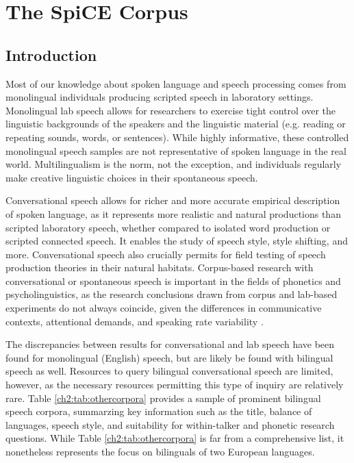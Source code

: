 
\chapter{The SpiCE Corpus}
\label{ch:Corpus}
\thispagestyle{fancy}

\section{Introduction}\label{ch2:sec:introduction}
Most of our knowledge about spoken language and speech processing comes from monolingual individuals producing scripted speech in laboratory settings. Monolingual lab speech allows for researchers to exercise tight control over the linguistic backgrounds of the speakers and the linguistic material (e.g. reading or repeating sounds, words, or sentences). While highly informative, these controlled monolingual speech samples are not representative of spoken language in the real world. Multilingualism is the norm, not the exception, and individuals regularly make creative linguistic choices in their spontaneous speech.

Conversational speech allows for richer and more accurate empirical description of spoken language, as it represents more realistic and natural productions than scripted laboratory speech, whether compared to isolated word production or scripted connected speech. It enables the study of speech style, style shifting, and more. Conversational speech also crucially permits for field testing of speech production theories in their natural habitats. Corpus-based research with conversational or spontaneous speech is important in the fields of phonetics and psycholinguistics, as the research conclusions drawn from corpus and lab-based experiments do not always coincide, given the differences in communicative contexts, attentional demands, and speaking rate variability \citep[e.g.][]{gahl_2012_reduce, johnson_language_2021}.

The discrepancies between results for conversational and lab speech have been found for monolingual (English) speech, but are likely be found with bilingual speech as well. Resources to query bilingual conversational speech are limited, however, as the necessary resources permitting this type of inquiry are relatively rare. Table \ref{ch2:tab:othercorpora} provides a sample of prominent bilingual speech corpora, summarzing key information such as the title, balance of languages, speech style, and suitability for within-talker and phonetic research questions. While Table \ref{ch2:tab:othercorpora} is far from a comprehensive list, it nonetheless represents the focus on bilinguals of two European languages.

